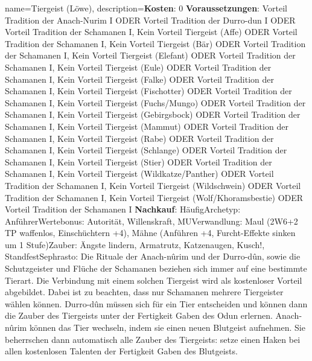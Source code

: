 {
    name={Tiergeist (Löwe)},
    description={\textbf{Kosten}: 0 \textbf{Voraussetzungen}: Vorteil Tradition der Anach-Nurim I ODER Vorteil Tradition der Durro-dun I ODER Vorteil Tradition der Schamanen I, Kein Vorteil Tiergeist (Affe) ODER Vorteil Tradition der Schamanen I, Kein Vorteil Tiergeist (Bär) ODER Vorteil Tradition der Schamanen I, Kein Vorteil Tiergeist (Elefant) ODER Vorteil Tradition der Schamanen I, Kein Vorteil Tiergeist (Eule) ODER Vorteil Tradition der Schamanen I, Kein Vorteil Tiergeist (Falke) ODER Vorteil Tradition der Schamanen I, Kein Vorteil Tiergeist (Fischotter) ODER Vorteil Tradition der Schamanen I, Kein Vorteil Tiergeist (Fuchs/Mungo) ODER Vorteil Tradition der Schamanen I, Kein Vorteil Tiergeist (Gebirgsbock) ODER Vorteil Tradition der Schamanen I, Kein Vorteil Tiergeist (Mammut) ODER Vorteil Tradition der Schamanen I, Kein Vorteil Tiergeist (Rabe) ODER Vorteil Tradition der Schamanen I, Kein Vorteil Tiergeist (Schlange) ODER Vorteil Tradition der Schamanen I, Kein Vorteil Tiergeist (Stier) ODER Vorteil Tradition der Schamanen I, Kein Vorteil Tiergeist (Wildkatze/Panther) ODER Vorteil Tradition der Schamanen I, Kein Vorteil Tiergeist (Wildschwein) ODER Vorteil Tradition der Schamanen I, Kein Vorteil Tiergeist (Wolf/Khoramsbestie) ODER Vorteil Tradition der Schamanen I \textbf{Nachkauf}: Häufig\newline Archetyp: Anführer\newline Wertebonus: Autorität, Willenskraft, MU\newline Verwandlung: Maul (2W6+2 TP waffenlos, Einschüchtern +4), Mähne (Anführen +4, Furcht-Effekte sinken um 1 Stufe)\newline Zauber: Ängste lindern, Armatrutz, Katzenaugen, Kusch!, Standfest\newline Sephrasto: Die Rituale der Anach-nûrim und der Durro-dûn, sowie die Schutzgeister und Flüche der Schamanen beziehen sich immer auf eine bestimmte Tierart. Die Verbindung mit einem solchen Tiergeist wird als kostenloser Vorteil abgebildet. Dabei ist zu beachten, dass nur Schamanen mehrere Tiergeister wählen können. Durro-dûn müssen sich für ein Tier entscheiden und können dann die Zauber des Tiergeists unter der Fertigkeit Gaben des Odun erlernen. Anach-nûrim können das Tier wechseln, indem sie einen neuen Blutgeist aufnehmen. Sie beherrschen dann automatisch alle Zauber des Tiergeists: setze einen Haken bei allen kostenlosen Talenten der Fertigkeit Gaben des Blutgeists.}
}


